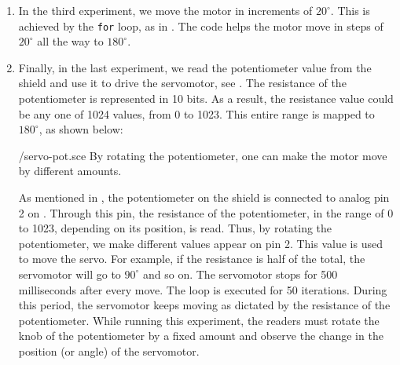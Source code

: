 \begin{enumerate}
        
        
  \item In the third experiment, we move the motor in increments of
        $20^\circ$.  This is achieved by the {\tt for} loop, as in
        . The code helps the motor move in steps of $20^\circ$ all
        the way to $180^\circ$.  
        
  \item Finally, in the last experiment, we read the potentiometer value
        from the shield and use it to drive the servomotor, see
        .  The resistance of the potentiometer is
        represented in 10 bits.  As a result, the resistance value could be
        any one of 1024 values, from 0 to 1023.  This entire range is
        mapped to $180^\circ$, as shown below:
        
        {\LocSERscicode/servo-pot.sce}
        By rotating the potentiometer, one can make
        the motor move by different amounts.
        
        As mentioned in , the potentiometer on the shield is connected 
        to analog pin 2 on \arduino. Through this pin, the resistance of the potentiometer, in the range of 0 to 1023,
        depending on its position, is read.  Thus, by rotating the
        potentiometer, we make different values appear on pin 2.  This value
        is used to move the servo.  For example, if the resistance is half
        of the total, the servomotor will go to $90^\circ$ and so on.  The
        servomotor stops for 500 milliseconds after every move.  The loop is
        executed for 50 iterations. During this period, the servomotor keeps moving as dictated by the
        resistance of the potentiometer. While running this experiment, the readers 
        must rotate the knob of the potentiometer by a fixed amount and observe 
        the change in the position (or angle) of the servomotor.   
        
        
        

\end{enumerate}
